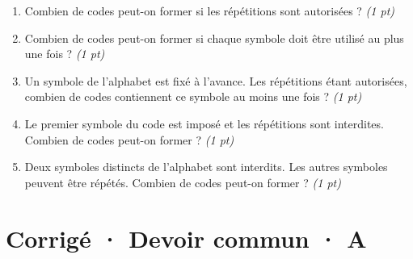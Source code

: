 \begin{enumerate}

\item Combien de codes peut-on former si les répétitions sont autorisées ? \hfill\textit{(1 pt)}

\item Combien de codes peut-on former si chaque symbole doit être utilisé au plus une fois ? \hfill\textit{(1 pt)}

\item Un symbole de l'alphabet est fixé à l'avance. Les répétitions étant autorisées, combien de codes contiennent ce symbole au moins une fois ? \hfill\textit{(1 pt)}

\item Le premier symbole du code est imposé et les répétitions sont interdites. Combien de codes peut-on former ? \hfill\textit{(1 pt)}

\item Deux symboles distincts de l'alphabet sont interdits. Les autres symboles peuvent être répétés. Combien de codes peut-on former ? \hfill\textit{(1 pt)}

\end{enumerate}

\ifmxteacher\mxnewpage

\section*{Corrigé · Devoir commun · A}\label{cor:3-3}

